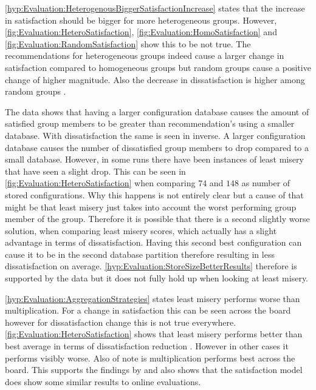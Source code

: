 \autoref{hyp:Evaluation:HeterogenousBiggerSatisfactionIncrease} states that the increase in satisfaction should be bigger for more heterogeneous groups. However, \autoref{fig:Evaluation:HeteroSatisfaction}, \autoref{fig:Evaluation:HomoSatisfaction} and \autoref{fig:Evaluation:RandomSatisfaction} show this to be not true. The recommendations for heterogeneous groups indeed cause a larger change in satisfaction compared to homogeneous groups but random groups cause a positive change of higher magnitude. Also the decrease in dissatisfaction is higher among random groups .

The data shows that having a larger configuration database causes the amount of satisfied group members to be greater than recommendation's using a smaller database. With dissatisfaction the same is seen in inverse. A larger configuration database causes the number of dissatisfied group members to drop compared to a small database. However, in some runs there have been instances of least misery that have seen a slight drop. This can be seen in \autoref{fig:Evaluation:HeteroSatisfaction} when comparing $74$ and $148$ as number of stored configurations. Why this happens is not entirely clear but a cause of that might be that least misery just takes into account the worst performing group member of the group. Therefore it is possible that there is a second slightly worse solution, when comparing least misery scores, which actually has a slight advantage in terms of dissatisfaction. Having this second best configuration can cause it to be in the second database partition therefore resulting in less dissatisfaction on average. \autoref{hyp:Evaluation:StoreSizeBetterResults} therefore is supported by the data but it does not fully hold up when looking at least misery.

\autoref{hyp:Evaluation:AggregationStrategies} states least misery performs worse than multiplication. For a change in satisfaction this can be seen across the board however for dissatisfaction change this is not true everywhere. \autoref{fig:Evaluation:HeteroSatisfaction} shows that least misery performs better than best average in terms of dissatisfaction reduction . However in other cases it performs visibly worse. Also of note is multiplication performs best across the board. This supports the findings by \citeauthor{Masthoff2015} \cite[p. 755f]{Masthoff2015} and also shows that the satisfaction model does show some similar results to online evaluations.


